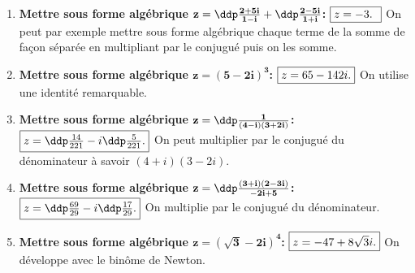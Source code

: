 \begin{correction}
\begin{enumerate}
\item  \textbf{Mettre sous forme alg\'ebrique $\mathbf{z=\ddp\frac{2+5i}{1-i}+\ddp\frac{2-5i}{1+i}}$:}  $\fbox{$z=-3$. }$ On peut par exemple mettre sous forme alg\'ebrique chaque terme de la somme de fa\c{c}on s\'epar\'ee en multipliant par le conjugu\'e puis on les somme.
\item \textbf{Mettre sous forme alg\'ebrique $\mathbf{z=(5-2i)^3}$:}  $\fbox{$z=65-142 i.$}$ On utilise une identit\'e remarquable.
\item \textbf{Mettre sous forme alg\'ebrique $\mathbf{z= \ddp\frac{1}{(4-i)(3+2i)}}$:}  $\fbox{$z=\ddp\frac{14}{221}-i\ddp\frac{5}{221}$.}$ On peut multiplier par le conjugu\'e du d\'enominateur \`{a} savoir $(4+i)(3-2i)$.
\item \textbf{Mettre sous forme alg\'ebrique $\mathbf{z=\ddp\frac{(3+i)(2-3i)}{-2i+5}}$:}  $\fbox{$z=\ddp\frac{69}{29}-i\ddp\frac{17}{29}$.}$  On multiplie par le conjugu\'e du d\'enominateur.
\item \textbf{Mettre sous forme alg\'ebrique $\mathbf{z=(\sqrt{3}-2i)^4}$:}  $\fbox{$z=-47+8\sqrt{3}i$.}$ On d\'eveloppe avec le bin\^{o}me de Newton.
\end{enumerate}
\end{correction}
